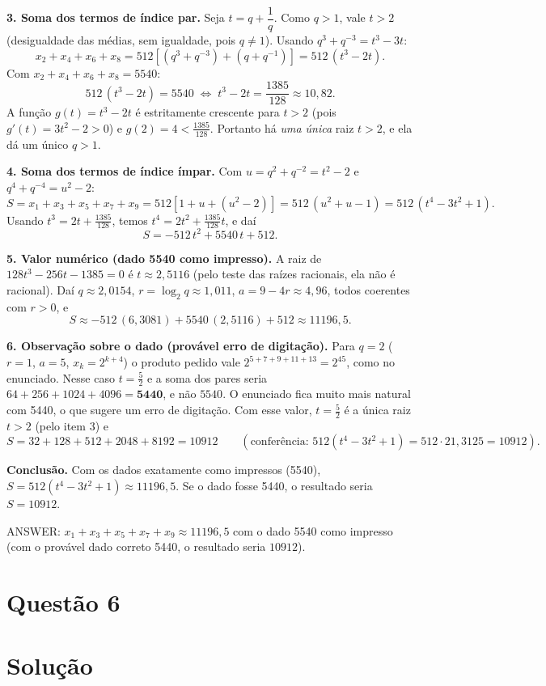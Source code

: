 \documentclass{article}%
\begin{document}
\textbf{3. Soma dos termos de índice par.} Seja $t = q + \dfrac1q$. Como $q>1$, vale $t>2$ (desigualdade das médias, sem igualdade, pois $q\ne1$). Usando $q^3+q^{-3} = t^3-3t$:
\[
x_2+x_4+x_6+x_8 = 512\left[(q^3+q^{-3})+(q+q^{-1})\right] = 512\,(t^3-2t).
\]
Com $x_2+x_4+x_6+x_8 = 5540$:
\[
512\,(t^3-2t) = 5540 \;\Longleftrightarrow\; t^3-2t = \frac{1385}{128}\approx 10{,}82 .
\]
A função $g(t)=t^3-2t$ é estritamente crescente para $t>2$ (pois $g'(t)=3t^2-2>0$) e $g(2)=4<\frac{1385}{128}$. Portanto há \emph{uma única} raiz $t>2$, e ela dá um único $q>1$.

\textbf{4. Soma dos termos de índice ímpar.} Com $u = q^2+q^{-2} = t^2-2$ e $q^4+q^{-4}=u^2-2$:
\[
S = x_1+x_3+x_5+x_7+x_9 = 512\left[1+u+(u^2-2)\right] = 512\,(u^2+u-1) = 512\,(t^4-3t^2+1).
\]
Usando $t^3 = 2t+\frac{1385}{128}$, temos $t^4 = 2t^2+\frac{1385}{128}t$, e daí
\[
S = -512\,t^2 + 5540\,t + 512 .
\]

\textbf{5. Valor numérico (dado 5540 como impresso).} A raiz de $128t^3-256t-1385=0$ é $t\approx 2{,}5116$ (pelo teste das raízes racionais, ela não é racional). Daí $q\approx 2{,}0154$, $r=\log_2 q\approx 1{,}011$, $a=9-4r\approx 4{,}96$, todos coerentes com $r>0$, e
\[
S \approx -512\,(6{,}3081) + 5540\,(2{,}5116) + 512 \approx 11196{,}5 .
\]

\textbf{6. Observação sobre o dado (provável erro de digitação).} Para $q=2$ ($r=1$, $a=5$, $x_k=2^{k+4}$) o produto pedido vale $2^{5+7+9+11+13}=2^{45}$, como no enunciado. Nesse caso $t=\frac52$ e a soma dos pares seria $64+256+1024+4096 = \mathbf{5440}$, e não $5540$. O enunciado fica muito mais natural com 5440, o que sugere um erro de digitação. Com esse valor, $t=\frac52$ é a única raiz $t>2$ (pelo item 3) e
\[
S = 32+128+512+2048+8192 = 10912 \qquad(\text{conferência: } 512(t^4-3t^2+1)=512\cdot 21{,}3125 = 10912).
\]

\textbf{Conclusão.} Com os dados exatamente como impressos (5540), $S=512(t^4-3t^2+1)\approx 11196{,}5$. Se o dado fosse 5440, o resultado seria $S=10912$.

ANSWER: $x_1+x_3+x_5+x_7+x_9 \approx 11196{,}5$ com o dado 5540 como impresso (com o provável dado correto 5440, o resultado seria $10912$).%
\newpage%
\section*{Questão 6}

\section*{Solução}
\end{document}
